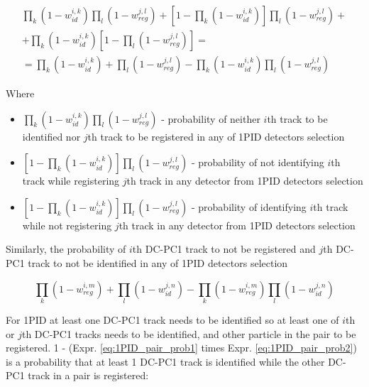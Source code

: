 \begin{multline}
	\prod_{k} \left( 1 - w_{id}^{i, k} \right) \prod_{l} \left( 1 - w_{reg}^{j, l} \right) + 
	\left[ 1 - \prod_{k} \left( 1 - w_{id}^{i, k} \right) \right] \prod_{l} \left( 1 - w_{reg}^{j, l} \right)
	+ \\
	+ \prod_{k} \left( 1 - w_{id}^{i, k} \right) \left[ 1 - \prod_{l} \left( 1 - w_{reg}^{j, l} \right) \right]
	= \\ =
	\prod_{k} \left( 1 - w_{id}^{i, k} \right) + \prod_{l} \left( 1 - w_{reg}^{j, l} \right) - 
	\prod_{k} \left( 1 - w_{id}^{i, k} \right) \prod_{l} \left( 1 - w_{reg}^{j, l} \right)
	\label{eq:1PID_pair_prob1}
\end{multline}

Where
\begin{itemize}
	\item $\prod_{k} \left( 1 - w_{id}^{i, k} \right) \prod_{l} \left( 1 - w_{reg}^{j, l} \right)$ - probability of neither $i$th track to be identified nor $j$th track to be registered in any of 1PID detectors selection
	\item $\left[ 1 - \prod_{k} \left( 1 - w_{id}^{i, k} \right) \right] \prod_{l} \left( 1 - w_{reg}^{j, l} \right)$ - probability of not identifying $i$th track while registering $j$th track in any detector from 1PID detectors selection
	\item $\left[ 1 - \prod_{k} \left( 1 - w_{id}^{i, k} \right) \right] \prod_{l} \left( 1 - w_{reg}^{j, l} \right)$ - probability of identifying $i$th track while not registering $j$th track in any detector from 1PID detectors selection
\end{itemize}

Similarly, the probability of $i$th DC-PC1 track to not be registered and $j$th DC-PC1 track to not be identified in any of 1PID detectors selection
	
\begin{equation}
	\prod_{k} \left( 1 - w_{reg}^{i, m} \right) + \prod_{l} \left( 1 - w_{id}^{j, n} \right) - 
	\prod_{k} \left( 1 - w_{reg}^{i, m} \right) \prod_{l} \left( 1 - w_{id}^{j, n} \right)
	\label{eq:1PID_pair_prob2}
\end{equation}

For 1PID at least one DC-PC1 track needs to be identified so at least one of $i$th or $j$th DC-PC1 tracks needs to be identified, and other particle in the pair to be registered. 1 - (Expr. \ref{eq:1PID_pair_prob1} times Expr. \ref{eq:1PID_pair_prob2}) is a probability that at least 1 DC-PC1 track is identified while the other DC-PC1 track in a pair is registered:

